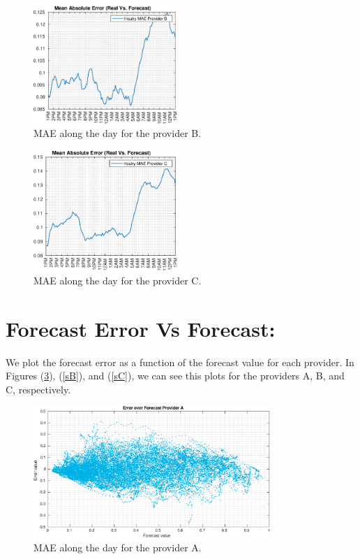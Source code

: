 \documentclass[aoas,preprint]{imsart}
\begin{document}
\begin{figure}[H]
\centering
\includegraphics[width=0.485\textwidth]{plots/mean_errors/prov_B/H_MAE.eps}
\caption{MAE along the day for the provider B.}
\label{HMAE_pB}
\end{figure}

\begin{figure}[H]
\centering
\includegraphics[width=0.485\textwidth]{plots/mean_errors/prov_C/H_MAE.eps}
\caption{MAE along the day for the provider C.}
\label{HMAE_pC}
\end{figure}

\section{Forecast Error Vs Forecast:}

We plot the forecast error as a function of the forecast value for each provider. In Figures (\ref{sA}), (\ref{sB}), and (\ref{sC}), we can see this plots for the providers A, B, and C, respectively.

\begin{figure}[H]
\centering
\includegraphics[width=0.8\textwidth]{plots/scatter/prov_A/scatter.eps}
\caption{MAE along the day for the provider A.}
\label{sA}
\end{figure}
\end{document}
